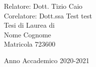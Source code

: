 \begin{titlepage}
\begin{center}
    \vfill
    \vspace{3cm}
    \begin{large}
    Relatore: Dott. Tizio Caio\\
    Corelatore: Dott.ssa Test test\\

    \vspace{1.0cm}
    Tesi di Laurea di\\
   Nome Cognome\\
    Matricola 723600\\
    \vspace{0.5cm}

    \end{large}

    Anno Accademico 2020-2021

  \end{center}
\end{titlepage}
